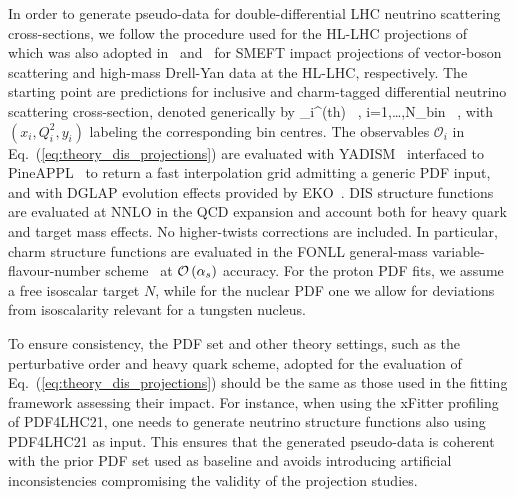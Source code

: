  In order to generate pseudo-data for double-differential
 LHC neutrino scattering cross-sections, we follow the procedure
 used for the HL-LHC projections of~\cite{AbdulKhalek:2018rok} which was
 also adopted in~\cite{Ethier:2021ydt} and~\cite{Greljo:2021kvv} for SMEFT impact projections
 of vector-boson scattering and high-mass Drell-Yan data at the HL-LHC, respectively.
 The starting point are predictions for inclusive and charm-tagged
 differential neutrino scattering cross-section, denoted generically by
 \be
 \label{eq:theory_dis_projections}
 _i^{{\rm (th)}} \equiv {} \, ,\quad
 i=1,\ldots,N_{\rm bin} \, ,
 \ee
 with $(x_i,Q^2_i,y_i)$ labeling the corresponding bin centres.
 The observables $\mathcal{O}_i $ in Eq.~(\ref{eq:theory_dis_projections})
are evaluated with 
{\sc\small YADISM}~\cite{yadism,Candido:2023utz}
interfaced to {\sc\small PineAPPL}~\cite{Carrazza:2020gss, christopher_schwan_2023_7995675}
to return a fast interpolation grid admitting a generic PDF input,
and with DGLAP evolution effects provided by {\sc\small EKO}~\cite{Candido:2022tld}.
%
DIS structure functions are evaluated at NNLO in the QCD expansion
and account both for heavy quark and target mass effects.
%
No higher-twists corrections are included.
%
In particular,
charm structure functions are evaluated in the FONLL general-mass variable-flavour-number
scheme~\cite{Forte:2010ta,Ball:2011mu,Faura:2020oom} at $\mathcal{O}\left( \alpha_s\right)$
accuracy.
%
For the proton PDF fits, we assume a free isoscalar target $N$, while
for the nuclear PDF one we allow for deviations from isoscalarity relevant
for a tungsten nucleus.

To ensure consistency, the PDF set and other theory settings, such as the perturbative
order and heavy quark scheme, adopted for the evaluation of
Eq.~(\ref{eq:theory_dis_projections}) should be the same as those
used in the fitting framework assessing their impact.
%
For instance, when using the {\sc\small xFitter} profiling of PDF4LHC21, one needs
to generate  neutrino structure functions also using PDF4LHC21 as input.
%
This ensures that the generated pseudo-data is coherent with the prior PDF
set used as baseline and avoids introducing artificial inconsistencies 
compromising the validity of the projection studies.

